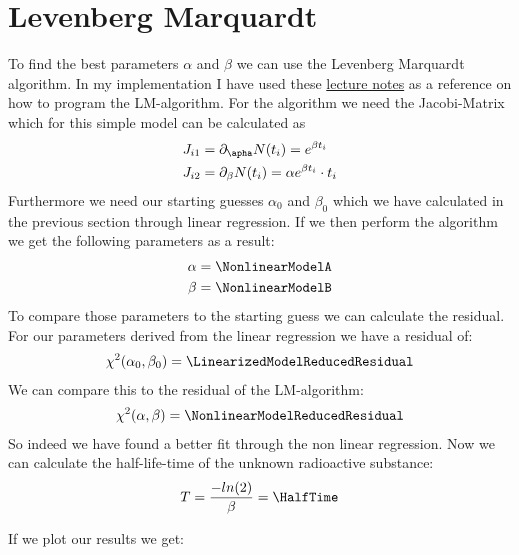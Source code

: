 \documentclass[11pt]{article}
\begin{document}
    \section{Levenberg Marquardt}
    To find the best parameters $\alpha$ and $\beta$ we can use the Levenberg Marquardt algorithm.
    In my implementation I have used these  \href{https://backend.orbit.dtu.dk/ws/portalfiles/portal/2721358/imm3215.pdf}{lecture notes}
    as a reference on how to program the LM-algorithm.
    For the algorithm we need the Jacobi-Matrix which for this simple model can be calculated as
    \begin{align*}
        J_{i1} &= \partial_{\apha} N(t_i) = e^{\beta t_i} \\
        J_{i2} &= \partial_{\beta} N(t_i) = \alpha e^{\beta t_i} \cdot t_i
    \end{align*}
    Furthermore we need our starting guesses $\alpha_0$ and $\beta_0$ which we have calculated in the previous section through linear regression.
    If we then perform the algorithm we get the following parameters as a result:
    \begin{align*}
        \alpha &= \NonlinearModelA \\
        \beta &= \NonlinearModelB
    \end{align*}
    To compare those parameters to the starting guess we can calculate the residual.
    For our parameters derived from the linear regression we have a residual of:
    \begin{align*}
        \chi^2(\alpha_0,\beta_0) = \LinearizedModelReducedResidual
    \end{align*}
    We can compare this to the residual of the LM-algorithm:
    \begin{align*}
        \chi^2(\alpha,\beta) = \NonlinearModelReducedResidual
    \end{align*}
    So indeed we have found a better fit through the non linear regression.
    Now we can calculate the half-life-time of the unknown radioactive substance:
    \begin{align*}
        T = \frac{-ln(2)}{\beta} = \HalfTime
    \end{align*}
    
    If we plot our results we get:
    \figNonLinearRegression
    
    
\end{document}
